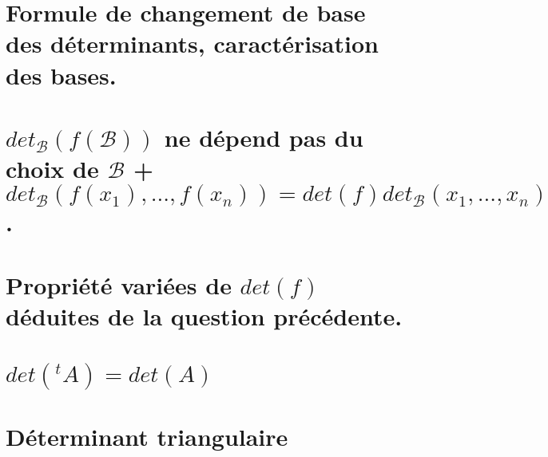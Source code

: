 \documentclass{article}
\begin{document}
	\section{Formule de changement de base des déterminants, caractérisation des bases.}
	\section{$det_{\mathcal B}(f(\mathcal B))$ ne dépend pas du choix de $\mathcal B$ + $det_{\mathcal B}(f(x_1),...,f(x_n))=det(f)det_{\mathcal B}(x_1,...,x_n) $.}
	\section{Propriété variées de $det(f)$ déduites de la question précédente.}
	\section{$det({}^tA)=det(A)$}
	\section{Déterminant triangulaire}
	
\end{document}

